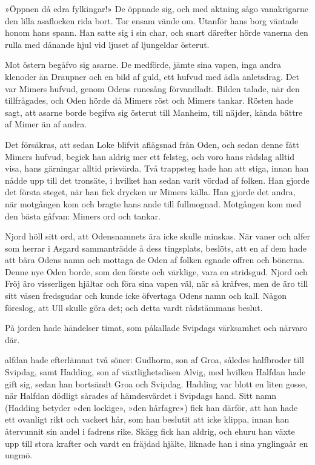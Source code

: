 »Öppnen då edra fylkingar!» De öppnade sig, och med aktning sågo
vanakrigarne den lilla asaflocken rida bort. Tor ensam vände om. Utanför
hans borg väntade honom hans spann. Han satte sig i sin char, och snart
därefter hörde vanerna den rulla med dånande hjul vid ljuset af
ljungeldar österut.

Mot östern begåfvo sig asarne. De medförde, jämte sina vapen, inga andra
klenoder än Draupner och en bild af guld, ett hufvud med ädla
anletsdrag. Det var Mimers hufvud, genom Odens runesång förvandladt.
Bilden talade, när den tillfrågades, och Oden hörde då Mimers röst och
Mimers tankar. Rösten hade sagt, att asarne borde begifva sig österut
till Manheim, till näjder, kända bättre af Mimer än af andra.

Det försäkras, att sedan Loke blifvit aflägsnad från Oden, och sedan
denne fått Mimers hufvud, begick han aldrig mer ett felsteg, och voro
hans rådslag alltid visa, hans gärningar alltid prisvärda. Två trappsteg
hade han att stiga, innan han nådde upp till det tronsäte, i hvilket han
sedan varit vördad af folken. Han gjorde det första steget, när han fick
drycken ur Mimers källa. Han gjorde det andra, när motgången kom och
bragte hans ande till fullmognad. Motgången kom med den bästa gåfvan:
Mimers ord och tankar.

Njord höll sitt ord, att Odensnamnets ära icke skulle minskas. När vaner
och alfer som herrar i Asgard sammanträdde å dess tingsplats, beslöts,
att en af dem hade att bära Odens namn och mottaga de Oden af folken
egnade offren och bönerna. Denne nye Oden borde, som den förste och
värklige, vara en stridsgud. Njord och Fröj äro visserligen hjältar och
föra sina vapen väl, när så kräfves, men de äro till sitt väsen
fredsgudar och kunde icke öfvertaga Odens namn och kall. Någon föreslog,
att Ull skulle göra det; och detta vardt rådstämmans beslut.

På jorden hade händelser timat, som påkallade Svipdags värksamhet och
närvaro där.

\endSecII


\dropcapH alfdan hade efterlämnat två söner: Gudhorm, son af Groa, således
halfbroder till Svipdag, samt Hadding, son af växtlighetsdisen Alvig,
med hvilken Halfdan hade gift sig, sedan han bortsändt Groa och Svipdag.
Hadding var blott en liten gosse, när Halfdan dödligt sårades af
hämdesvärdet i Svipdags hand. Sitt namn (Hadding betyder »den lockige»,
»den hårfagre») fick han därför, att han hade ett ovanligt rikt och
vackert hår, som han beslutit att icke klippa, innan han återvunnit sin
andel i fadrens rike. Skägg fick han aldrig, och ehuru han växte upp
till stora krafter och vardt en fräjdad hjälte, liknade han i sina
ynglingaår en ungmö.

